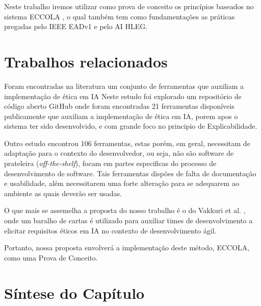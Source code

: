 Neste trabalho iremos utilizar como prova de conceito os princípios baseados no sistema ECCOLA \cite{ECCOLA}, o qual também tem como fundamentações as práticas pregadas pelo \acrshort{IEEE} \acrshort{EAD}v1 \cite{ieee2020EADv1} e pelo \acrshort{AI HLEG}\cite{HLEG_EthicsGuidelinesForTrustworthyAI}.


\section{Trabalhos relacionados}

Foram encontradas na literatura um conjunto de ferramentas que auxiliam a implementação de ética em IA \cite{siqueira2021ethical} Neste estudo foi explorado um repositório de código aberto GitHub onde foram encontradas 21 ferramentas disponíveis publicamente que auxiliam a implementação de ética em IA, porem apos o sistema ter sido desenvolvido, e com grande foco no principio de Explicabilidade. 

Outro estudo \cite{morley2019initial} encontrou 106 ferramentas, estas porém, em geral, necessitam de adaptação para o contexto do desenvolvedor, ou seja, não são software de prateleira (\textit{off-the-shelf}), focam em partes especificas do processo de desenvolvimento de software. Tais ferramentas dispões de falta de documentação e usabilidade, além necessitarem uma forte alteração para se adequarem ao ambiente as quais deverão ser usadas.

O que mais se assemelha a proposta do nosso trabalho é o do Vakkuri et al. \cite{ECCOLA}, onde um baralho de cartas é utilizado para auxiliar times de desenvolvimento a elicitar requisitos éticos em IA no contexto de desenvolvimento ágil.

Portanto, nossa proposta envolverá a implementação deste método, ECCOLA, como uma Prova de Conceito.

\section{Síntese do Capítulo}


